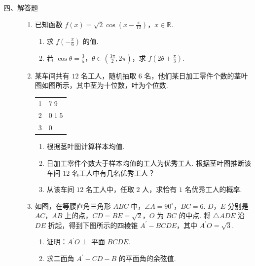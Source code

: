 \begin{description}

    \item[四、解答题]

    \begin{enumerate}[leftmargin=5pt]

      \addtocounter{enumi}{+15}

        \item 已知函数 \(f(x) = \sqrt{2}\cos\left(x - \frac{\pi}{12}\right)\)，\(x \in \mathbb{R}\).

\begin{enumerate}
\item 求 \(f\left(-\frac{\pi}{6}\right)\) 的值.
\item 若 \(\cos \theta = \frac{3}{5}\)，\(\theta \in \left(\frac{3\pi}{2}, 2\pi\right)\)，求 \(f\left(2\theta + \frac{\pi}{3}\right)\).
\end{enumerate}

        \item 某车间共有 \(12\) 名工人，随机抽取 \(6\) 名，他们某日加工零件个数的茎叶图如图所示，其中茎为十位数，叶为个位数.

\begin{center}
\begin{tabular}{c|l}
1 & \(7\;9\) \\
2 & \(0\;1\;5\) \\
3 & \(0\)
\end{tabular}
\end{center}

\begin{enumerate}
\item 根据茎叶图计算样本均值.
\item 日加工零件个数大于样本均值的工人为优秀工人. 根据茎叶图推断该车间 \(12\) 名工人中有几名优秀工人？
\item 从该车间 \(12\) 名工人中，任取 \(2\) 人，求恰有 \(1\) 名优秀工人的概率.
\end{enumerate}

        \item 如图，在等腰直角三角形 \(ABC\) 中，\(\angle A = 90^{\circ}\)，\(BC = 6\).
\(D\)，\(E\) 分别是 \(AC\)，\(AB\) 上的点，\(CD = BE = \sqrt{2}\)，\(O\) 为 \(BC\) 的中点.
将 \(\triangle ADE\) 沿 \(DE\) 折起，得到下图所示的四棱锥 \(A^{\prime} - BCDE\)，其中 \(A^{\prime}O = \sqrt{3}\).

\begin{enumerate}
\item 证明：\(A^{\prime}O \perp\) 平面 \(BCDE\).
\item 求二面角 \(A^{\prime} - CD - B\) 的平面角的余弦值.
\end{enumerate}


\end{enumerate}
\end{description}

